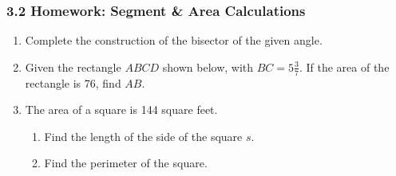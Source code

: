 \documentclass[12pt, twoside]{article}
\begin{document}
  \subsubsection*{3.2 Homework: Segment \& Area Calculations}
  \begin{enumerate}
  
  \item Complete the construction of the bisector of the given angle. 
  \vspace{3cm}
    \begin{center}
    \end{center} \vspace{4cm}

  \item Given the rectangle $ABCD$ shown below, with $BC=5 \frac{3}{7}$. If the area of the rectangle is 76, find $AB$.
    \begin{flushleft}
    \end{flushleft}
    \vspace{1.5cm}

\newpage

  \item The area of a square is 144 square feet. 
    \begin{enumerate}
      \item Find the length of the side of the square $s$. \vspace{2cm}
      \item Find the perimeter of the square.
    \end{enumerate} \vspace{2cm}


\end{enumerate}
\end{document}
